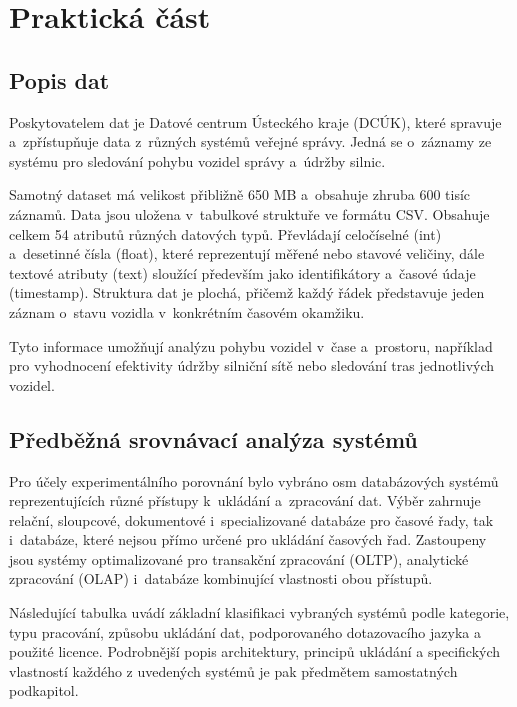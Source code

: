 \chapter{Praktická část}\label{practical}

\section{Popis dat}\label{sec:popisdat}

Poskytovatelem dat je Datové centrum Ústeckého kraje (DCÚK), které spravuje a~zpřístupňuje data z~různých systémů veřejné správy.
Jedná se o~záznamy ze systému pro sledování pohybu vozidel správy a~údržby silnic. 

Samotný dataset má velikost přibližně 650 MB a~obsahuje zhruba 600 tisíc záznamů. Data jsou uložena v~tabulkové struktuře ve formátu CSV.
Obsahuje celkem 54 atributů různých datových typů. Převládají celočíselné (int) a~desetinné čísla (float), které reprezentují měřené nebo stavové veličiny, dále textové atributy (text) sloužící především jako identifikátory a~časové údaje (timestamp). 
Struktura dat je plochá, přičemž každý řádek představuje jeden záznam o~stavu vozidla v~konkrétním časovém okamžiku.

Tyto informace umožňují analýzu pohybu vozidel v~čase a~prostoru, například pro vyhodnocení efektivity údržby silniční sítě nebo sledování tras jednotlivých vozidel.

\section{Předběžná srovnávací analýza systémů}\label{sec:db_overview}
Pro účely experimentálního porovnání bylo vybráno osm databázových systémů reprezentujících různé přístupy k~ukládání a~zpracování dat. 
Výběr zahrnuje relační, sloupcové, dokumentové i~specializované databáze pro časové řady, tak i~databáze, které nejsou přímo určené pro ukládání časových řad.
Zastoupeny jsou systémy optimalizované pro transakční zpracování (OLTP), analytické zpracování (OLAP) i~databáze kombinující vlastnosti obou přístupů.

Následující tabulka uvádí základní klasifikaci vybraných systémů podle kategorie, typu pracování, způsobu ukládání dat, podporovaného dotazovacího jazyka a použité licence.
Podrobnější popis architektury, principů ukládání a specifických vlastností každého z uvedených systémů je pak předmětem samostatných podkapitol.


